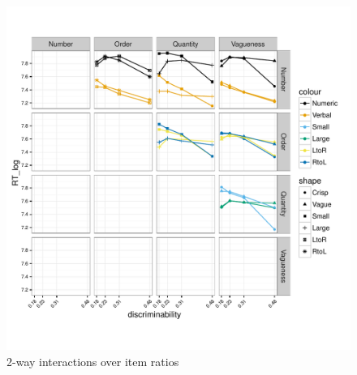\documentclass[a4paper,12pt]{article}\usepackage[]{graphicx}\usepackage[]{color}
\makeatletter
\def\maxwidth{ %
  \ifdim\Gin@nat@width>\linewidth
    \linewidth
  \else
    \Gin@nat@width
  \fi
}
\newenvironment{knitrout}{}{} %
\makeatother
\begin{document}
\begin{knitrout}\scriptsize
{}\color{fgcolor}\begin{figure}[hbtp]

{\centering \includegraphics[width=\maxwidth]{figure/graphics-22way-1} 

}

\caption[2-way interactions over item ratios]{2-way interactions over item ratios}\label{fig:22way}
\end{figure}


\end{knitrout}

\clearpage
\end{document}
